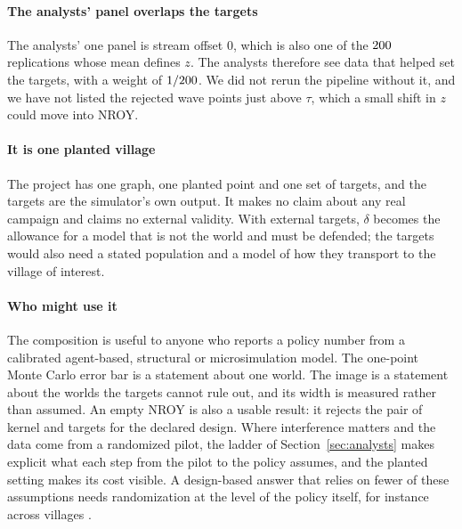 \paragraph{The analysts' panel overlaps the targets} The analysts' one panel is
stream offset $0$, which is also one of the $200$ replications whose mean
defines $z$. The analysts therefore see data that helped set the targets, with a
weight of $1/200$. We did not rerun the pipeline without it, and we have not
listed the rejected wave points just above $\tau$, which a small shift in $z$
could move into NROY.

\paragraph{It is one planted village} The project has one graph, one planted point
and one set of targets, and the targets are the simulator's own output. It makes
no claim about any real campaign and claims no external validity. With external
targets, $\delta$ becomes the allowance for a model that is not the world and must
be defended; the targets would also need a stated population and a model of how
they transport to the village of interest.

\paragraph{Who might use it} The composition is useful to anyone who reports a
policy number from a calibrated agent-based, structural or microsimulation model.
The one-point Monte Carlo error bar is a statement about one world. The image is a
statement about the worlds the targets cannot rule out, and its width is measured
rather than assumed. An empty NROY is also a usable result: it rejects the pair of
kernel and targets for the declared design. Where interference matters and the
data come from a randomized pilot, the ladder of Section~\ref{sec:analysts} makes
explicit what each step from the pilot to the policy assumes, and the planted
setting makes its cost visible. A design-based answer that relies on fewer of
these assumptions needs randomization at the level of the policy itself, for
instance across villages \citep{hudgens2008,baird2018}.
